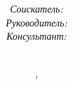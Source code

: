 \documentclass[14pt]{beamer}
\begin{document}
	\title{\small{\textcolor{blue}{\thesisTitle}}}
	\author{\small{%
			\begin{tabular}{lll}
				\emph{Соискатель:} & & \thesisAuthorShort\\
				\emph{Руководитель:} & \supervisorARegaliaShort & \supervisorAFioShort \\
				\emph{Консультант:} & \supervisorBRegaliaShort & \supervisorBFioShort
			\end{tabular}
		}\\%
		\vspace{30pt}%
		\thesisOrganization%
		\vspace{20pt}%
	}
	\date{\small{\thesisCity, \thesisYear}}

\maketitle
\end{document}
